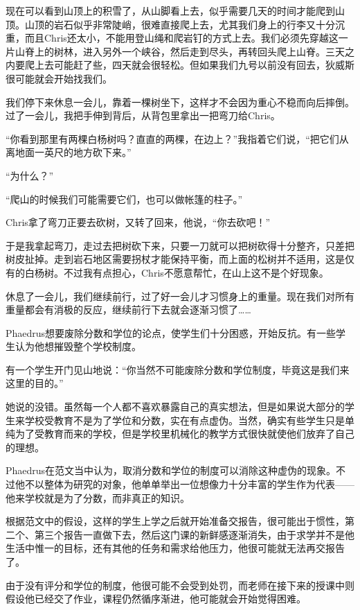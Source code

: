 \documentclass[UTF8]{article}
\begin{document}
\par 现在可以看到山顶上的积雪了，从山脚看上去，似乎需要几天的时间才能爬到山顶。山顶的岩石似乎非常陡峭，很难直接爬上去，尤其我们身上的行李又十分沉重，而且Chris还太小，不能用登山绳和爬岩钉的方式上去。我们必须先穿越这一片山脊上的树林，进入另外一个峡谷，然后走到尽头，再转回头爬上山脊。三天之内要爬上去可能赶了些，四天就会很轻松。但如果我们九号以前没有回去，狄威斯很可能就会开始找我们。
\par 我们停下来休息一会儿，靠着一棵树坐下，这样才不会因为重心不稳而向后摔倒。过了一会儿，我把手伸到背后，从背包里拿出一把弯刀给Chris。
\par “你看到那里有两棵白杨树吗？直直的两棵，在边上？”我指着它们说，“把它们从离地面一英尺的地方砍下来。”
\par “为什么？”
\par “爬山的时候我们可能需要它们，也可以做帐篷的柱子。”
\par Chris拿了弯刀正要去砍树，又转了回来，他说，“你去砍吧！”
\par 于是我拿起弯刀，走过去把树砍下来，只要一刀就可以把树砍得十分整齐，只差把树皮扯掉。走到岩石地区需要拐杖才能保持平衡，而上面的松树并不适用，这是仅有的白杨树。不过我有点担心，Chris不愿意帮忙，在山上这不是个好现象。
\par 休息了一会儿，我们继续前行，过了好一会儿才习惯身上的重量。现在我们对所有重量都会有消极的反应，继续前行下去就会逐渐习惯了……
\par Phaedrus想要废除分数和学位的论点，使学生们十分困惑，开始反抗。有一些学生认为他想摧毁整个学校制度。
\par 有一个学生开门见山地说：“你当然不可能废除分数和学位制度，毕竟这是我们来这里的目的。”
\par 她说的没错。虽然每一个人都不喜欢暴露自己的真实想法，但是如果说大部分的学生来学校受教育不是为了学位和分数，实在有点虚伪。当然，确实有些学生只是单纯为了受教育而来的学校，但是学校里机械化的教学方式很快就使他们放弃了自己的理想。
\par Phaedrus在范文当中认为，取消分数和学位的制度可以消除这种虚伪的现象。不过他不以整体为研究的对象，他单单举出一位想像力十分丰富的学生作为代表——他来学校就是为了分数，而非真正的知识。
\par 根据范文中的假设，这样的学生上学之后就开始准备交报告，很可能出于惯性，第二个、第三个报告一直做下去，然后这门课的新鲜感逐渐消失，由于求学并不是他生活中惟一的目标，还有其他的任务和需求给他压力，他很可能就无法再交报告了。
\par 由于没有评分和学位的制度，他很可能不会受到处罚，而老师在接下来的授课中则假设他已经交了作业，课程仍然循序渐进，他可能就会开始觉得困难。
\end{document}
